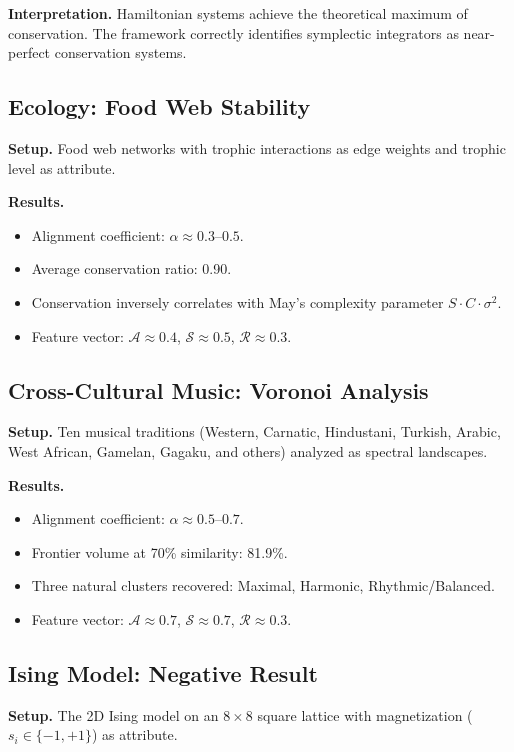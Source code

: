 \documentclass[12pt,letterpaper]{article}
\newcommand{\cA}{\mathcal{A}}
\newcommand{\cS}{\mathcal{S}}
\newcommand{\cR}{\mathcal{R}}
\begin{document}
\textbf{Interpretation.} Hamiltonian systems achieve the theoretical maximum of conservation. The framework correctly identifies symplectic integrators as near-perfect conservation systems.

\subsection{Ecology: Food Web Stability}

\textbf{Setup.} Food web networks with trophic interactions as edge weights and trophic level as attribute.

\textbf{Results.}
\begin{itemize}
  \item Alignment coefficient: $\alpha \approx 0.3$--$0.5$.
  \item Average conservation ratio: 0.90.
  \item Conservation inversely correlates with May's complexity parameter $S \cdot C \cdot \sigma^2$.
  \item Feature vector: $\cA \approx 0.4$, $\cS \approx 0.5$, $\cR \approx 0.3$.
\end{itemize}

\subsection{Cross-Cultural Music: Voronoi Analysis}

\textbf{Setup.} Ten musical traditions (Western, Carnatic, Hindustani, Turkish, Arabic, West African, Gamelan, Gagaku, and others) analyzed as spectral landscapes.

\textbf{Results.}
\begin{itemize}
  \item Alignment coefficient: $\alpha \approx 0.5$--$0.7$.
  \item Frontier volume at 70\% similarity: 81.9\%.
  \item Three natural clusters recovered: Maximal, Harmonic, Rhythmic/Balanced.
  \item Feature vector: $\cA \approx 0.7$, $\cS \approx 0.7$, $\cR \approx 0.3$.
\end{itemize}

\subsection{Ising Model: Negative Result}
\label{sec:ising}

\textbf{Setup.} The 2D Ising model on an $8 \times 8$ square lattice with magnetization ($s_i \in \{-1, +1\}$) as attribute.
\end{document}
